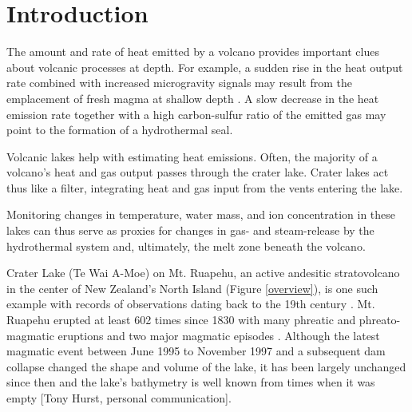 \documentclass{bmc_template/bmcart}
\begin{document}


\section*{Introduction}

The amount and rate of heat emitted by a volcano provides important clues about
volcanic processes at depth. For example, a sudden rise in the heat output rate
combined with increased microgravity signals may result from the emplacement of
fresh magma at shallow depth \cite{Brown1991}. A slow decrease in the heat
emission rate together with a high carbon-sulfur ratio of the emitted gas may
point to the formation of a hydrothermal seal.

Volcanic lakes help with estimating heat emissions. Often, the majority of a
volcano's heat and gas output passes through the crater lake. Crater lakes act thus
like a filter, integrating heat and gas input from the vents entering the lake.

Monitoring changes in temperature, water mass, and ion concentration in these
lakes can thus serve as proxies for changes in gas- and steam-release by the
hydrothermal system and, ultimately, the melt zone beneath the volcano. 

Crater Lake (Te Wai A-Moe) on Mt. Ruapehu, an active andesitic stratovolcano in
the center of New Zealand's North Island (Figure \ref{overview}), is one such
example with records of observations dating back to the 19th century
\citep[e.g.][]{Friedlander1898}. Mt. Ruapehu erupted at least 602 times since
1830 with many phreatic and phreato-magmatic eruptions and two major magmatic
episodes \citep{Scott2013}. Although the latest magmatic event between June
1995 to November 1997 and a subsequent dam collapse changed the shape and
volume of the lake, it has been largely unchanged since then and the lake's
bathymetry is well known from times when it was empty [Tony Hurst, personal
communication].
\end{document}
